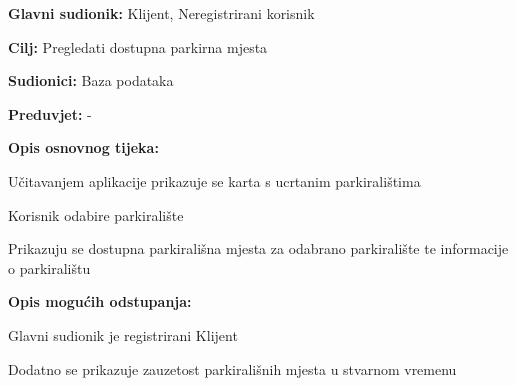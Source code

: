					\noindent {}
					\begin{packed_item}
	
						\item \textbf{Glavni sudionik: }Klijent, Neregistrirani korisnik
						\item  \textbf{Cilj:} Pregledati dostupna parkirna mjesta
						\item  \textbf{Sudionici:} Baza podataka
						\item  \textbf{Preduvjet:} -
						\item  \textbf{Opis osnovnog tijeka:}
						
						\item[] \begin{packed_enum}
	

							\item Učitavanjem aplikacije prikazuje se karta s ucrtanim parkiralištima
							\item Korisnik odabire parkiralište
							\item Prikazuju se dostupna parkirališna mjesta za odabrano parkiralište te informacije o parkiralištu
							
						\end{packed_enum}

                            \item  \textbf{Opis mogućih odstupanja:}
						
						\item[] \begin{packed_item}
	
							\item[3.a] Glavni sudionik je registrirani Klijent
							\item[] \begin{packed_enum}
								
								\item Dodatno se prikazuje zauzetost parkirališnih mjesta u stvarnom vremenu
								
								
							\end{packed_enum}
	
							
						\end{packed_item}	
					\end{packed_item}

